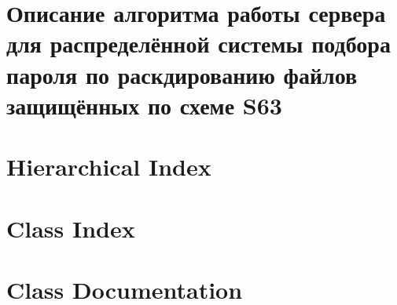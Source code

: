 \documentclass[twoside]{book}
\newcommand{\+}{\discretionary{\mbox{\scriptsize$\hookleftarrow$}}{}{}}
\newcommand{\clearemptydoublepage}{%
  \newpage{\pagestyle{empty}\cleardoublepage}%
}
\begin{document}
\chapter{Описание алгоритма работы сервера для распределённой системы подбора пароля по раскдированию файлов защищённых по схеме S63}
\label{md__home_antonov_work_project_pr_s63_brute_force_server_pr_s63_brute_force_server__readme}

\chapter{Hierarchical Index}

\chapter{Class Index}

\chapter{Class Documentation}




















\backmatter
\newpage
{}
\clearemptydoublepage
{}
\printindex
\end{document}
